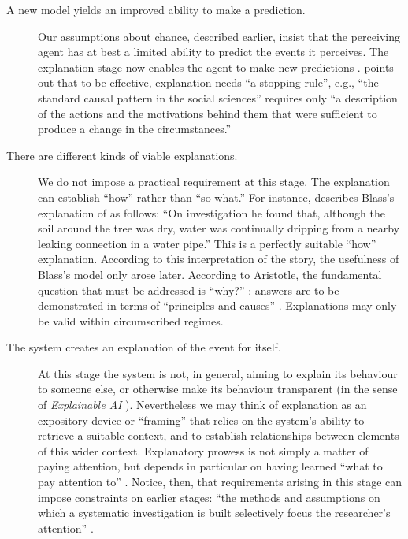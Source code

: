 \begin{description}
 \item[A new model yields an improved ability to make a prediction.]
   Our assumptions about chance, described earlier, insist that the
   perceiving agent has at best a limited ability to predict the events
   it perceives.  The explanation stage now enables the agent to make
   new predictions \cite[p.~389]{sowa2000knowledge}.
   \citet[p.~101]{swirski2000between} points out that to be effective,
   explanation needs ``a stopping rule'', e.g., ``the standard causal
   pattern in the social sciences'' requires only ``a description of
   the actions and the motivations behind them that were sufficient to
   produce a change in the circumstances.''
 \item[There are different kinds of viable explanations.] We do not
   impose a practical requirement at this stage.  The explanation can
   establish ``how'' rather than ``so what.''  For instance,
   \citet{van1994anatomy} describes Blass's explanation of as follows:
   ``On investigation he found that, although the soil around the tree
   was dry, water was continually dripping from a nearby leaking
   connection in a water pipe.''  This is a perfectly suitable ``how''
   explanation.  According to this interpretation of the story, the
   usefulness of Blass's model only arose later.  According to
   Aristotle, the fundamental question that must be addressed is
   ``why?''  \cite{sep-aristotle-causality}: answers are to be
   demonstrated in terms of ``principles and causes'' \cite[Book Gamma,
     p.~81]{lawson1998metaphysics}.  Explanations may only be valid
   within circumscribed regimes.
 \item[The system creates an explanation of the event for itself.]  At
   this stage the system is not, in general, aiming to explain its
   behaviour to someone else, or otherwise make its behaviour transparent
   (in the sense of \emph{Explainable AI}
   \cite{lane2005explainable}).  Nevertheless we may think of
   explanation as an expository device or ``framing''
   \cite{pease2011computational} that relies on the system's ability to
   retrieve a suitable context, and to establish relationships between
   elements of this wider context.  Explanatory prowess is not simply a
   matter of paying attention, but depends in particular on having
   learned ``what to pay attention to'' \cite[p.~4]{levin1975bateson}.
   Notice, then, that requirements arising in this stage can impose
   constraints on earlier stages: ``the methods and assumptions
   on which a systematic investigation is built selectively focus the
   researcher's attention''
   \cite[p.~131]{floppyearedrabbits1958barber}.
 \end{description}
                                         
